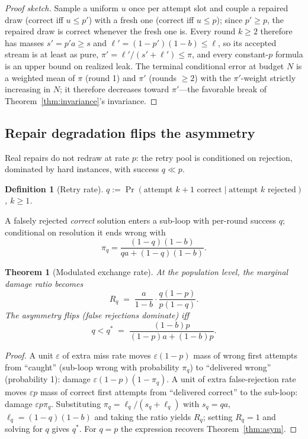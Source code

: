 \documentclass[11pt]{article}
\newtheorem{theorem}{Theorem}
\newtheorem{definition}{Definition}
\begin{document}
\begin{proof}[Proof sketch]
Sample a uniform $u$ once per attempt slot and couple a repaired
draw (correct iff $u \le p'$) with a fresh one (correct iff
$u \le p$); since $p' \ge p$, the repaired draw is correct whenever
the fresh one is.  Every round $k \ge 2$ therefore has masses
$s' = p'a \ge s$ and $\ell' = (1-p')(1-b) \le \ell$, so its
accepted stream is at least as pure,
$\pi' = \ell'/(s'+\ell') \le \pi$, and every constant-$p$ formula
is an upper bound on realized leak.  The terminal conditional
error at budget $N$ is a weighted mean of $\pi$ (round 1) and
$\pi'$ (rounds $\ge 2$) with the $\pi'$-weight strictly increasing
in $N$; it therefore decreases toward $\pi'$---the favorable break
of Theorem~\ref{thm:invariance}'s invariance.
\end{proof}

\subsection{Repair degradation flips the asymmetry}\label{sec:degrade}

Real repairs do not redraw at rate $p$: the retry pool is
conditioned on rejection, dominated by hard instances, with success
$q \ll p$.

\begin{definition}[Retry rate]\label{def:q}
$q := \Pr(\text{attempt } k{+}1 \text{ correct} \mid \text{attempt }
k \text{ rejected})$, $k \ge 1$.
\end{definition}

A falsely rejected \emph{correct} solution enters a sub-loop with
per-round success $q$; conditional on resolution it ends wrong with
\[
\pi_q = \frac{(1-q)(1-b)}{qa + (1-q)(1-b)}.
\]

\begin{theorem}[Modulated exchange rate]\label{thm:flip}
At the population level, the marginal damage ratio becomes
\[
R_q \;=\; \frac{a}{1-b}\cdot\frac{q(1-p)}{p(1-q)}.
\]
The asymmetry \emph{flips} (false rejections dominate) iff
\[
q < q^\ast \;=\; \frac{(1-b)p}{(1-p)a + (1-b)p}.
\]
\end{theorem}

\begin{proof}
A unit $\varepsilon$ of extra miss rate moves $\varepsilon(1-p)$
mass of wrong first attempts from ``caught'' (sub-loop wrong with
probability $\pi_q$) to ``delivered wrong'' (probability 1):
damage $\varepsilon(1-p)(1-\pi_q)$.  A unit of extra false-rejection
rate moves $\varepsilon p$ mass of correct first attempts from
``delivered correct'' to the sub-loop: damage $\varepsilon p \pi_q$.
Substituting $\pi_q = \ell_q/(s_q+\ell_q)$ with $s_q = qa$,
$\ell_q = (1-q)(1-b)$ and taking the ratio yields $R_q$; setting
$R_q = 1$ and solving for $q$ gives $q^\ast$.  For $q=p$ the
expression recovers Theorem~\ref{thm:asym}.
\end{proof}
\end{document}
